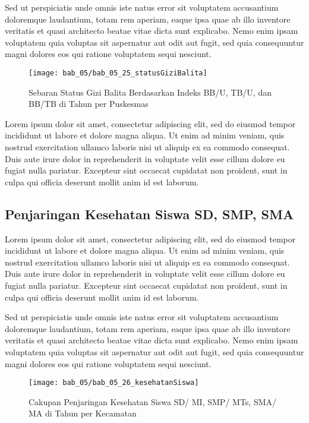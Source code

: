 Sed ut perspiciatis unde omnis iste natus error sit voluptatem accusantium doloremque laudantium, totam rem aperiam, eaque ipsa quae ab illo inventore veritatis et quasi architecto beatae vitae dicta sunt explicabo. Nemo enim ipsam voluptatem quia voluptas sit aspernatur aut odit aut fugit, sed quia consequuntur magni dolores eos qui ratione voluptatem sequi nesciunt.

\begin{figure}[H]
  \centering
  \texttt{[image: bab\_05/bab\_05\_25\_statusGiziBalita]}
  \caption{Sebaran Status Gizi Balita Berdasarkan Indeks BB/U, TB/U, dan BB/TB di \namaKabupaten Tahun \tP per
Puskesmas}
  \label{fig:Status-Gizi-Balita}
\end{figure}

Lorem ipsum dolor sit amet, consectetur adipiscing elit, sed do eiusmod tempor incididunt ut labore et dolore magna aliqua. Ut enim ad minim veniam, quis nostrud exercitation ullamco laboris nisi ut aliquip ex ea commodo consequat. Duis aute irure dolor in reprehenderit in voluptate velit esse cillum dolore eu fugiat nulla pariatur. Excepteur sint occaecat cupidatat non proident, sunt in culpa qui officia deserunt mollit anim id est laborum.

\subsection{Penjaringan Kesehatan Siswa SD, SMP, SMA}
Lorem ipsum dolor sit amet, consectetur adipiscing elit, sed do eiusmod tempor incididunt ut labore et dolore magna aliqua. Ut enim ad minim veniam, quis nostrud exercitation ullamco laboris nisi ut aliquip ex ea commodo consequat. Duis aute irure dolor in reprehenderit in voluptate velit esse cillum dolore eu fugiat nulla pariatur. Excepteur sint occaecat cupidatat non proident, sunt in culpa qui officia deserunt mollit anim id est laborum.

Sed ut perspiciatis unde omnis iste natus error sit voluptatem accusantium doloremque laudantium, totam rem aperiam, eaque ipsa quae ab illo inventore veritatis et quasi architecto beatae vitae dicta sunt explicabo. Nemo enim ipsam voluptatem quia voluptas sit aspernatur aut odit aut fugit, sed quia consequuntur magni dolores eos qui ratione voluptatem sequi nesciunt.

\begin{figure}[H]
    \centering
    \texttt{[image: bab\_05/bab\_05\_26\_kesehatanSiswa]}
    \caption{Cakupan Penjaringan Kesehatan Siswa SD/ MI, SMP/ MTs, SMA/ MA di \namaKabupaten Tahun \tP per Kecamatan}
    \label{fig:Cakupan-Penjaringan-Siswa}
\end{figure}

